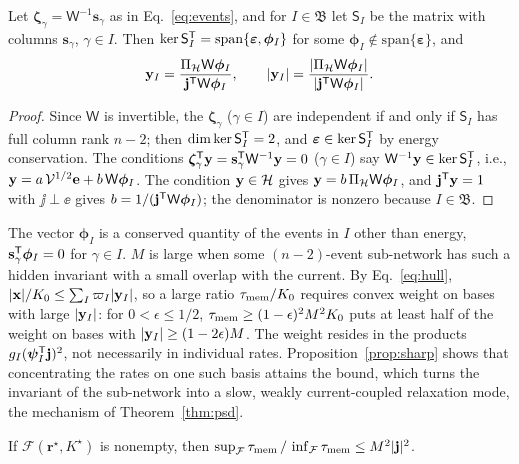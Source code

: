 \begin{proposition}\label{prop:subnetwork}
Let $\bm\zeta_\gamma=\mathsf W^{-1}\mathbf s_\gamma$ as in Eq.~\eqref{eq:events}, and for $I\in\mathfrak B$
let $\mathsf S_I$ be the matrix with columns $\mathbf s_\gamma$, $\gamma\in I$. Then
$\ker\mathsf S_I^{\mathsf T}=\mathrm{span}\{\bm\varepsilon,\bm\phi_I\}$ for some $\bm\phi_I\notin\mathrm{span}\{\bm\varepsilon\}$, and
\begin{equation}
\mathbf y_I=\frac{\Pi_{\mathcal H}\mathsf W\bm\phi_I}{\mathbf j^{\mathsf T}\mathsf W\bm\phi_I},\qquad
|\mathbf y_I|=\frac{|\Pi_{\mathcal H}\mathsf W\bm\phi_I|}{|\mathbf j^{\mathsf T}\mathsf W\bm\phi_I|}.
\label{eq:subnetwork}
\end{equation}
\end{proposition}

\begin{proof}
Since $\mathsf W$ is invertible, the $\bm\zeta_\gamma$ ($\gamma\in I$) are independent if and only if
$\mathsf S_I$ has full column rank $n-2$; then $\dim\ker\mathsf S_I^{\mathsf T}=2$, and $\bm\varepsilon\in\ker\mathsf S_I^{\mathsf T}$
by energy conservation. The conditions $\bm\zeta_\gamma^{\mathsf T}\mathbf y=\mathbf s_\gamma^{\mathsf T}\mathsf W^{-1}\mathbf y=0$
($\gamma\in I$) say $\mathsf W^{-1}\mathbf y\in\ker\mathsf S_I^{\mathsf T}$, i.e.,
$\mathbf y=a\,\mathcal V^{1/2}\mathbf e+b\,\mathsf W\bm\phi_I$. The condition $\mathbf y\in\mathcal H$ gives
$\mathbf y=b\,\Pi_{\mathcal H}\mathsf W\bm\phi_I$, and $\mathbf j^{\mathsf T}\mathbf y=1$ with $\jj\perp\ee$ gives
$b=1/(\mathbf j^{\mathsf T}\mathsf W\bm\phi_I)$; the denominator is nonzero because $I\in\mathfrak B$.
\end{proof}

The vector $\bm\phi_I$ is a conserved quantity of the events in $I$ other than energy,
$\mathbf s_\gamma^{\mathsf T}\bm\phi_I=0$ for $\gamma\in I$. $M$ is large when some $(n-2)$-event sub-network
has such a hidden invariant with a small overlap with the current. By Eq.~\eqref{eq:hull},
$|\mathbf x|/K_0\le\sum_I\varpi_I|\mathbf y_I|$, so a large ratio $\tau_{\rm mem}/K_0$ requires convex weight on bases with
large $|\mathbf y_I|$: for $0<\epsilon\le1/2$, $\tau_{\rm mem}\ge(1-\epsilon)^2M^2K_0$ puts at least half of the weight on
bases with $|\mathbf y_I|\ge(1-2\epsilon)M$. The weight resides in the products $g_I(\bm\psi_I^{\mathsf T}\mathbf j)^2$, not
necessarily in individual rates. Proposition~\ref{prop:sharp} shows that concentrating the rates on one
such basis attains the bound, which turns the invariant of the sub-network into a slow, weakly
current-coupled relaxation mode, the mechanism of Theorem~\ref{thm:psd}.

\begin{corollary}\label{cor:gap}
If $\mathcal F(\mathbf r^\star,K^\star)$ is nonempty, then
$\sup_{\mathcal F}\tau_{\rm mem}\,/\,\inf_{\mathcal F}\tau_{\rm mem}\le M^2|\mathbf j|^2$.
\end{corollary}


